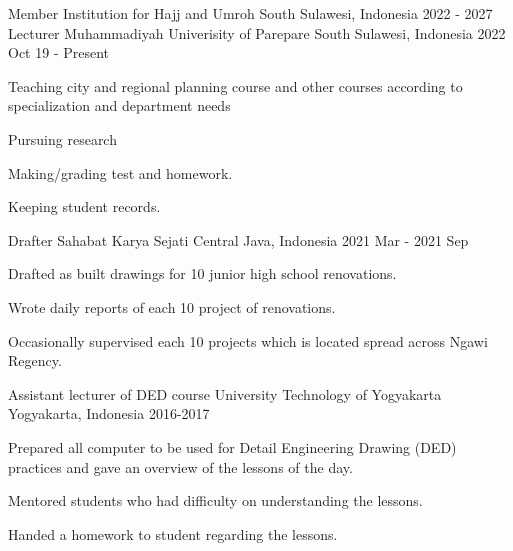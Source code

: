 

\begin{cventries}
	\cventry
	{Member} %
	{Institution for Hajj and Umroh} %
	{South Sulawesi, Indonesia} %
	{2022 - 2027} %
	{}
	\cventry
	{Lecturer} %
	{Muhammadiyah Univerisity of Parepare} %
	{South Sulawesi, Indonesia} %
	{2022 Oct 19  - Present} %
	{
		\begin{cvitems} %
			\item{Teaching city and regional planning course and other courses according to specialization and department needs}
			\item{Pursuing research}
			\item {Making/grading test and homework.}
			\item{Keeping student records.}
		\end{cvitems}
	}
	\cventry
	{Drafter} %
	{Sahabat Karya Sejati} %
	{Central Java, Indonesia} %
	{2021 Mar - 2021 Sep} %
	{
		\begin{cvitems} %
			\item {Drafted as built drawings for 10 junior high school renovations.}
			\item{Wrote daily reports of each 10 project of renovations.}
			\item{Occasionally supervised each 10 projects which is located spread across Ngawi Regency.}
		\end{cvitems}
	}
	\cventry
	{Assistant lecturer of DED course} %
	{University Technology of Yogyakarta} %
	{Yogyakarta, Indonesia} %
	{2016-2017} %
	{
		\begin{cvitems} %
			\item {Prepared all computer to be used for Detail Engineering Drawing (DED) practices and gave an overview of the lessons of the day.}
			\item{Mentored students who had difficulty on understanding the lessons.}
			\item{Handed a homework to student regarding the lessons.}

\end{cvitems}}
\end{cventries}
